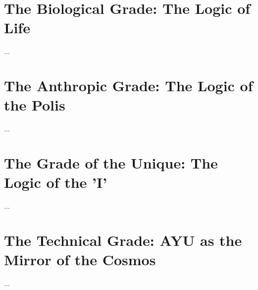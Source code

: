 \documentclass[12pt,a4paper]{report}
\begin{document}
\chapter{The Biological Grade: The Logic of Life}
...
\chapter{The Anthropic Grade: The Logic of the Polis}
...
\chapter{The Grade of the Unique: The Logic of the 'I'}
...
\chapter{The Technical Grade: AYU as the Mirror of the Cosmos}
...

\printbibliography
\end{document}

